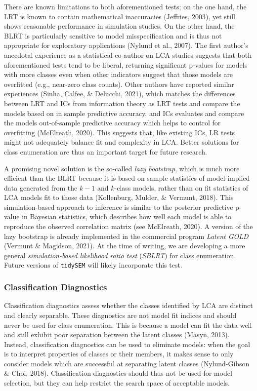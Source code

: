 \documentclass[
  ,man,floatsintext]{apa6}
\begin{document}
There are known limitations to both aforementioned tests;
on the one hand, the LRT is known to contain mathematical inaccuracies (Jeffries, 2003), yet still shows reasonable performance in simulation studies.
On the other hand, the BLRT is particularly sensitive to model misspecification and is thus not appropriate for exploratory applications (Nylund et al., 2007).
The first author's anecdotal experience as a statistical co-author on LCA studies suggests that both aforementioned tests tend to be liberal,
returning significant p-values for models with more classes even when other indicators suggest that those models are overfitted (e.g., near-zero class counts).
Other authors have reported similar experiences (Sinha, Calfee, \& Delucchi, 2021), which matches the differences between LRT and ICs from information theory as LRT tests and compare the models based on in sample predictive accuracy, and ICs evaluates and compare the models out-of-sample predictive accuracy which helps to control for overfitting (McElreath, 2020).
This suggests that, like existing ICs, LR tests might not adequately balance fit and complexity in LCA.
Better solutions for class enumeration are thus an important target for future research.

A promising novel solution is the so-called \emph{lazy bootstrap},
which is much more efficient than the BLRT because it is based on sample statistics of model-implied data generated from the \(k-1\) and \(k\)-class models,
rather than on fit statistics of LCA models fit to those data (Kollenburg, Mulder, \& Vermunt, 2018).
This simulation-based approach to inference is similar to the posterior predictive p-value in Bayesian statistics,
which describes how well each model is able to reproduce the observed correlation matrix (see McElreath, 2020).
A version of the lazy bootstrap is already implemented in the commercial program \emph{Latent GOLD} (Vermunt \& Magidson, 2021).
At the time of writing, we are developing a more general \emph{simulation-based likelihood ratio test} (\emph{SBLRT}) for class enumeration.
Future versions of \texttt{tidySEM} will likely incorporate this test.

\hypertarget{classification-diagnostics}{%
\subsubsection{Classification Diagnostics}\label{classification-diagnostics}}

Classification diagnostics assess whether the classes identified by LCA are distinct and clearly separable.
These diagnostics are not model fit indices and should never be used for class enumeration.
This is because a model can fit the data well and still exhibit poor separation between the latent classes (Masyn, 2013).
Instead, classification diagnostics can be used to eliminate models:
when the goal is to interpret properties of classes or their members,
it makes sense to only consider models which are successful at separating latent classes (Nylund-Gibson \& Choi, 2018).
Classification diagnostics should thus not be used for model selection, but they can help restrict the search space of acceptable models.
\end{document}
